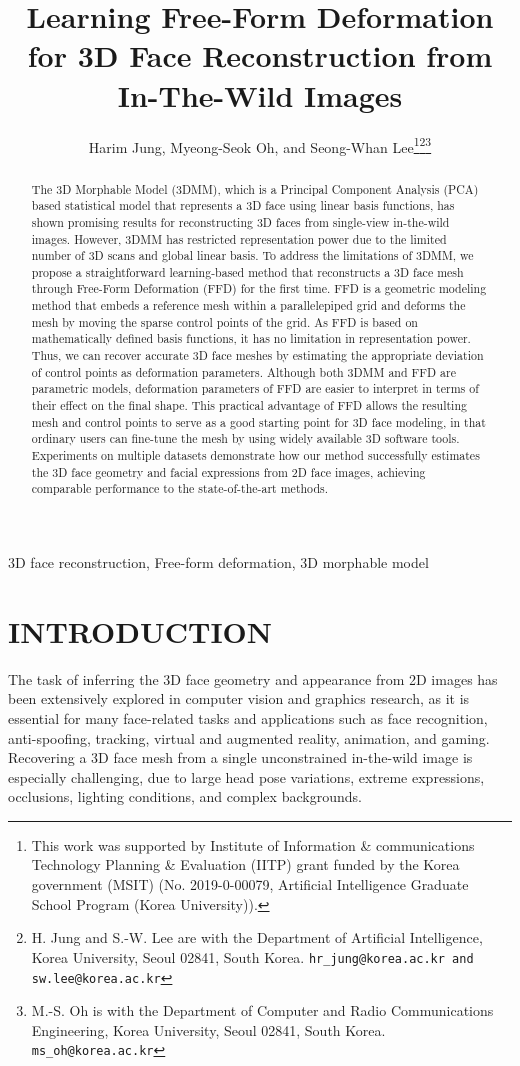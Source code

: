 \documentclass[letterpaper, 10 pt, conference]{ieeeconf}
\title{\LARGE \bf
Learning Free-Form Deformation for 3D Face Reconstruction from In-The-Wild Images}
\author{Harim Jung, Myeong-Seok Oh, and Seong-Whan Lee\thanks{This work was supported by Institute of Information \& communications Technology Planning \& Evaluation (IITP) grant funded by the Korea government (MSIT) (No. 2019-0-00079,  Artificial Intelligence Graduate School Program (Korea University)).}\thanks{H. Jung and S.-W. Lee are with the Department of Artificial Intelligence, Korea University, Seoul 02841, South Korea.
{\tt\small hr\_jung@korea.ac.kr and sw.lee@korea.ac.kr}}\thanks{M.-S. Oh is with the Department of Computer and Radio Communications Engineering, Korea University, Seoul 02841, South Korea.
{\tt\small ms\_oh@korea.ac.kr}}}
\begin{document}
\maketitle
\thispagestyle{empty}
\pagestyle{empty}


\begin{abstract}
The 3D Morphable Model (3DMM), which is a Principal Component Analysis (PCA) based statistical model that represents a 3D face using linear basis functions, has shown promising results for reconstructing 3D faces from single-view in-the-wild images. However, 3DMM has restricted representation power due to the limited number of 3D scans and global linear basis. To address the limitations of 3DMM, we propose a straightforward learning-based method that reconstructs a 3D face mesh through Free-Form Deformation (FFD) for the first time. FFD is a geometric modeling method that embeds a reference mesh within a parallelepiped grid and deforms the mesh by moving the sparse control points of the grid. As FFD is based on mathematically defined basis functions, it has no limitation in representation power. Thus, we can recover accurate 3D face meshes by estimating the appropriate deviation of control points as deformation parameters. 
Although both 3DMM and FFD are parametric models, deformation parameters of FFD are easier to interpret in terms of their effect on the final shape.
This practical advantage of FFD allows the resulting mesh and control points to serve as a good starting point for 3D face modeling, in that ordinary users can fine-tune the mesh by using widely available 3D software tools. Experiments on multiple datasets demonstrate how our method successfully estimates the 3D face geometry and facial expressions from 2D face images, achieving comparable performance to the state-of-the-art methods.


\end{abstract}
\begin{keywords}
3D face reconstruction, Free-form deformation, 3D morphable model
\end{keywords}



\section{INTRODUCTION}

The task of inferring the 3D face geometry and appearance from 2D images has been extensively explored in computer vision and graphics research, as it is essential for many face-related tasks and applications such as face recognition, anti-spoofing, tracking, virtual and augmented reality, animation, and gaming. Recovering a 3D face mesh from a single unconstrained in-the-wild image is especially challenging, due to large head pose variations, extreme expressions, occlusions, lighting conditions, and complex backgrounds.
\end{document}
